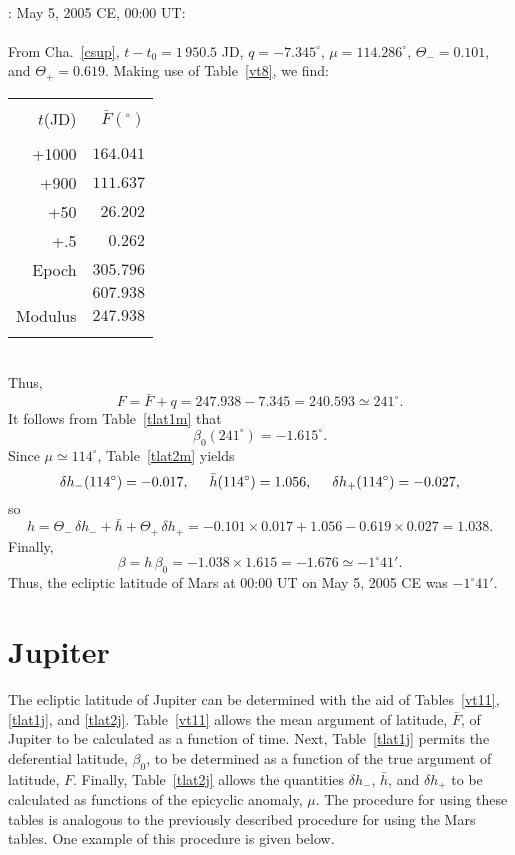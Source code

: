 ~\\
: May 5, 2005 CE, 00:00 UT:\\
~\\
From Cha.~\ref{csup}, $t-t_0=1\,950.5$ JD, 
$q= -7.345^\circ$,  $\mu= 114.286^\circ$, $\Theta_-=0.101$, and
$\Theta_+ = 0.619$.
 Making use of
Table~\ref{vt8}, we find:\\
\begin{tabular}{rr}
&\\
$t$(JD) & $\bar{F}(^\circ)$\\[-2ex]
&\\
+1000 & $164.041$ \\
+900 & $111.637$\\
+50 & $26.202$ \\
+.5 & $0.262$\\
Epoch & $305.796$ \\\cline{2-2}
&$607.938$ \\\cline{2-2}
Modulus & $247.938$ \\ 
&\\
\end{tabular}\\
Thus,
$$
F = \bar{F} + q = 247.938-7.345 = 240.593\simeq 241^\circ.
$$
It follows from Table~\ref{tlat1m} that
$$
\beta_0(241^\circ) = -1.615^\circ.
$$
Since $\mu\simeq 114^\circ$, Table~\ref{tlat2m} yields
$$
\delta h_-(114^\circ) = -0.017,\mbox{\hspace{0.5cm}}\bar{h}(114^\circ)=1.056, \mbox{\hspace{0.5cm}}\delta h_+(114^\circ) = -0.027,
$$
so
$$
h = \Theta_-\,\delta h_- + \bar{h}+\Theta_+\,\delta h_+ = -0.101\times 0.017+1.056-0.619\times 0.027 = 1.038.
$$
Finally,
$$
\beta = h\,\beta_0 = -1.038\times 1.615 = -1.676 \simeq -1^\circ 41'.
$$
Thus,
the ecliptic latitude of Mars at 00:00 UT on May 5, 2005 CE was $-1^\circ 41'$.

\section{Jupiter}
The ecliptic latitude of Jupiter can be determined with the aid of Tables~\ref{vt11}, \ref{tlat1j}, and \ref{tlat2j}. Table~\ref{vt11} allows
the mean argument of latitude, $\bar{F}$, of Jupiter to be calculated as a function of
time. Next, Table~\ref{tlat1j} permits the deferential latitude, $\beta_0$, to
be determined as a function of the true argument of latitude, $F$. Finally, Table~\ref{tlat2j} allows the quantities
$\delta h_-$, $\bar{h}$, and $\delta h_+$ to be calculated as functions of the epicyclic
anomaly, $\mu$.  The procedure for using these tables is analogous to the previously described procedure for
using the Mars tables.
One example of this procedure is given below.

